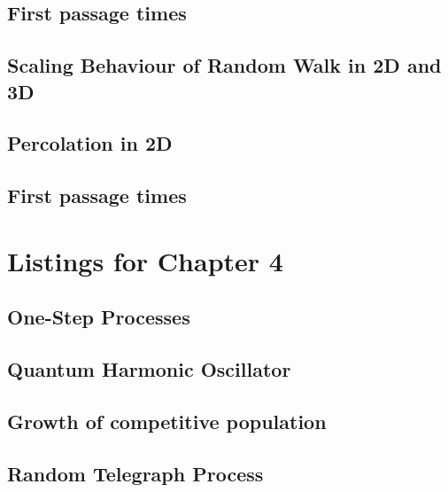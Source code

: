 \subsection{First passage times}


\subsection{Scaling Behaviour of Random Walk in 2D and 3D}


\subsection{Percolation in 2D}


\subsection{First passage times}


\section{Listings for Chapter 4}

\subsection{One-Step Processes}



\subsection{Quantum Harmonic Oscillator}


\subsection{Growth of competitive population}


\subsection{Random Telegraph Process}


